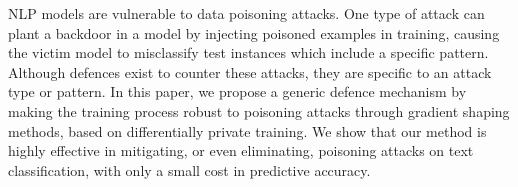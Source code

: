 NLP models are vulnerable to data poisoning attacks. One type of attack can plant a backdoor in a model by injecting poisoned examples in training, causing the victim model to misclassify test instances which include a specific pattern. Although defences exist to counter these attacks, they are specific to an attack type or pattern. In this paper, we propose a generic defence mechanism by making the training process robust to poisoning attacks through gradient shaping methods, based on differentially private training. We show that our method is highly effective in mitigating, or even eliminating, poisoning attacks on text classification, with only a small cost in predictive accuracy.
